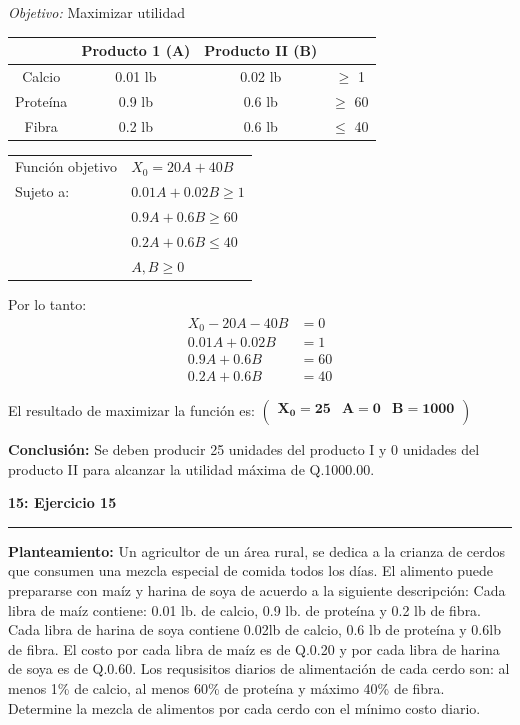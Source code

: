 \documentclass[11pt]{article}
\newcommand\problema[2]{\vspace{.01in}\textbf{#1: #2}\vspace{.5em}\hrule\vspace{.10in}}
\newcommand\planteamiento{\vspace{.10in}\textbf{Planteamiento: }}
\newcommand\conclusion{\vspace{.10in}\textbf{Conclusión: }}
\newcommand\obj{\vspace{.10in}\textit{Objetivo: }}
\begin{document}
\obj Maximizar utilidad

\begin{tabular}{|c|c|c|c|}
\hline 
 & Producto 1 (A)  & Producto II (B) &  \\ 
\hline 
Calcio & 0.01 lb & 0.02 lb & $\geq$ 1 \\ 
\hline 
Proteína & 0.9 lb & 0.6 lb & $\geq$ 60 \\ 
\hline 
Fibra & 0.2 lb & 0.6 lb & $\leq$ 40 \\ 
\hline 
\end{tabular}

\begin{table}[h]
\begin{tabular}{ll}
Función objetivo & $X_0 = 20A+40B$    \\
Sujeto a:        & $0.01A + 0.02B \geq 1$ \\
                 & $0.9A + 0.6B \geq 60$ \\
                 & $0.2A + 0.6B \leq 40$ \\
                 & $A,B \geq 0$    
\end{tabular}
\end{table}

Por lo tanto:
\begin{align*}
X_0 - 20A - 40B &= 0\\
0.01A + 0.02B &= 1\\
0.9A + 0.6B &= 60\\
0.2A + 0.6B &= 40
\end{align*}

El resultado de maximizar la función es:
\begin{math}
\mathbf{\left(\begin{array}{rrr}X_0=25&A=0&B=1000\\\end{array}\right)}
\end{math}

\conclusion Se deben producir 25 unidades del producto I y 0 unidades del producto II para alcanzar la utilidad máxima de Q.1000.00.

\pagebreak
\problema{15}{Ejercicio 15}
\planteamiento
Un agricultor de un área rural, se dedica a la crianza de cerdos que consumen una mezcla especial de comida todos los días. El alimento puede prepararse con maíz y harina de soya de acuerdo a la siguiente descripción: Cada libra de maíz contiene: 0.01 lb. de calcio, 0.9 lb. de proteína y 0.2 lb de fibra. Cada libra de harina de soya contiene 0.02lb de calcio, 0.6 lb de proteína y 0.6lb de fibra. El costo por cada libra de maíz es de Q.0.20 y por cada libra de harina de soya es de Q.0.60. Los requsisitos diarios de alimentación de cada cerdo son: al menos 1\% de calcio, al menos 60\% de proteína y máximo 40\% de fibra. Determine la mezcla de alimentos por cada cerdo con el mínimo costo diario.
\end{document}
